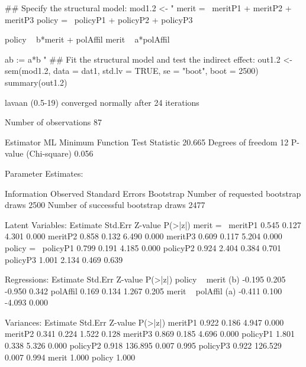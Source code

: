 \begin{Schunk}
\begin{Sinput}
 ## Specify the structural model:
 mod1.2 <- "
 merit =~ meritP1 + meritP2 + meritP3
 policy =~ policyP1 + policyP2 + policyP3
 
 policy ~ b*merit + polAffil
 merit ~ a*polAffil
 
 ab := a*b
 "
 ## Fit the structural model and test the indirect effect:
 out1.2 <- sem(mod1.2, data = dat1, std.lv = TRUE, 
               se = "boot", boot = 2500)
 summary(out1.2)
\end{Sinput}
\begin{Soutput}
lavaan (0.5-19) converged normally after  24 iterations

  Number of observations                            87

  Estimator                                         ML
  Minimum Function Test Statistic               20.665
  Degrees of freedom                                12
  P-value (Chi-square)                           0.056

Parameter Estimates:

  Information                                 Observed
  Standard Errors                            Bootstrap
  Number of requested bootstrap draws             2500
  Number of successful bootstrap draws            2477

Latent Variables:
                   Estimate  Std.Err  Z-value  P(>|z|)
  merit =~                                            
    meritP1           0.545    0.127    4.301    0.000
    meritP2           0.858    0.132    6.490    0.000
    meritP3           0.609    0.117    5.204    0.000
  policy =~                                           
    policyP1          0.799    0.191    4.185    0.000
    policyP2          0.924    2.404    0.384    0.701
    policyP3          1.001    2.134    0.469    0.639

Regressions:
                   Estimate  Std.Err  Z-value  P(>|z|)
  policy ~                                            
    merit      (b)   -0.195    0.205   -0.950    0.342
    polAffil          0.169    0.134    1.267    0.205
  merit ~                                             
    polAffil   (a)   -0.411    0.100   -4.093    0.000

Variances:
                   Estimate  Std.Err  Z-value  P(>|z|)
    meritP1           0.922    0.186    4.947    0.000
    meritP2           0.341    0.224    1.522    0.128
    meritP3           0.869    0.185    4.696    0.000
    policyP1          1.801    0.338    5.326    0.000
    policyP2          0.918  136.895    0.007    0.995
    policyP3          0.922  126.529    0.007    0.994
    merit             1.000                           
    policy            1.000                           


\end{Soutput}
\end{Schunk}
